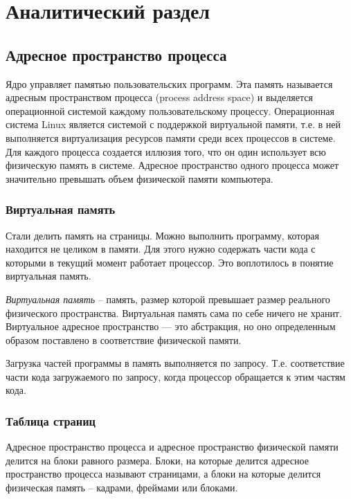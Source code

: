 
\chapter{Аналитический раздел}
\label{cha:analysis}

\section{Адресное пространство процесса}

Ядро управляет памятью пользовательских программ.
Эта память называется адресным пространством процесса (process address space) 
и выделяется операционной системой каждому пользовательскому процессу.
Операционная система Linux является системой с поддержкой виртуальной памяти,
т.е. в ней выполняется виртуализация ресурсов памяти среди всех процессов в системе.
Для каждого процесса создается иллюзия того, что он один использует всю физическую память в системе.
Адресное пространство одного процесса может значительно превышать объем физической памяти компьютера.

\subsection{Виртуальная память}

Стали делить память на страницы. Можно выполнить программу, которая находится не целиком в памяти. 
Для этого нужно содержать части кода с которыми в текущий момент работает процессор.
Это воплотилось в понятие виртуальная память.

\textit{Виртуальная память} – память, размер которой превышает размер реального физического пространства.
Виртуальная память сама по себе ничего не хранит. 
Виртуальное адресное пространство — это абстракция, но оно определенным образом поставлено в соответствие физической памяти.

Загрузка частей программы в память выполняется по запросу. 
Т.е. соответствие части кода загружаемого по запросу, когда процессор обращается к этим частям кода.

\subsection{Таблица страниц}

Адресное пространство процесса и адресное пространство физической памяти делится на блоки равного размера. Блоки, на которые делится адресное пространство процесса называют страницами, а блоки на которые делится физическая память – кадрами, фреймами или блоками.

